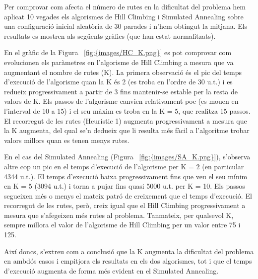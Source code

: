 

Per comprovar com afecta el número de rutes en la dificultat del problema hem aplicat 10 vegades els algorismes de Hill Climbing i Simulated Annealing sobre una configuració inicial aleatòria de 30 parades i n'hem obtingut la mitjana. Els resultats es mostren als següents gràfics (que han estat normalitzats).


En el gràfic de la Figura ~\ref{fig:{images/HC_K.png}} es pot comprovar com evolucionen els paràmetres en l'algorisme de Hill Climbing a mesura que va augmentant el nombre de rutes (K). La primera observació és el pic del temps d'execució de l'algorisme quan la K és 2 (es troba en l'ordre de 30 u.t.) i es redueix progressivament a partir de 3 fins mantenir-se estable per la resta de valors de K. Els passos de l'algorisme canvien relativament poc (es mouen en l'interval de 10 a 15) i el seu màxim es troba en la K = 5, que realitza 15 passos. El recorregut de les rutes (Heurístic 1) augmenta progressivament a mesura que la K augmenta, del qual se'n dedueix que li resulta més fàcil a l'algoritme trobar valors millors quan es tenen menys rutes.



En el cas del Simulated Annealing (Figura ~\ref{fig:{images/SA_K.png}}), s'observa altre cop un pic en el temps d'execució de l'algorisme per K = 2 (en particular 4344 u.t.). El temps d'execució baixa progressivament fins que veu el seu mínim en K = 5 (3094 u.t.) i torna a pujar fins quasi 5000 u.t. per K = 10. Els passos segueixen més o menys el mateix patró de creixement que el temps d'execució. El recorregut de les rutes, però, creix igual que el Hill Climbing progressivament a mesura que s'afegeixen més rutes al problema. Tanmateix, per qualsevol K, sempre millora el valor de l'algorisme de Hill Climbing per un valor entre 75 i 125.

Així doncs, s'extreu com a conclusió que la K augmenta la dificultat del problema en ambdós casos i empitjora els resultats en els dos algorismes, tot i que el temps d'execució augmenta de forma més evident en el Simulated Annealing.